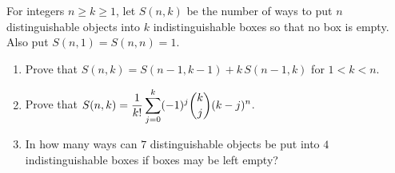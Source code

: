For integers $n\ge k\ge1$, let $S(n,k)$ be the number of ways to put $n$ distinguishable objects into $k$ indistinguishable boxes so that no box is empty. Also put $S(n,1)=S(n,n)=1$.
\begin{enumerate}
\item[(a)] Prove that $S(n,k)=S(n-1,k-1)+k\,S(n-1,k)$ for $1<k<n$.
\item[(b)] Prove that $S(n,k)=\dfrac{1}{k!}\displaystyle\sum_{j=0}^{k}(-1)^j\dbinom kj(k-j)^n$.
\item[(c)] In how many ways can $7$ distinguishable objects be put into $4$ indistinguishable boxes if boxes may be left empty?
\end{enumerate}
